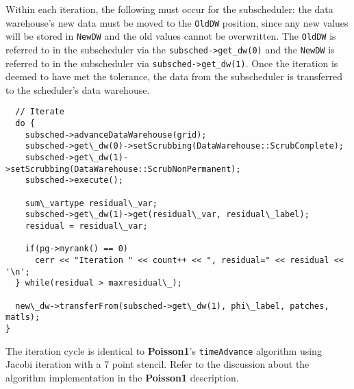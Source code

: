 \documentclass[12pt]{report}
\begin{document}
Within each iteration, the following must occur for the subscheduler:
the data warehouse's new data must be moved to the \texttt{OldDW}
position, since any new values will be stored in \texttt{NewDW} and
the old values cannot be overwritten.  The \texttt{OldDW} is referred
to in the subscheduler via the \texttt{subsched->get\_dw(0)} and the
\texttt{NewDW} is referred to in the subscheduler via
\texttt{subsched->get\_dw(1)}.  Once the iteration is deemed to have
met the tolerance, the data from the subscheduler is transferred to
the scheduler's data warehouse.

\begin{verbatim}
  // Iterate
  do {
    subsched->advanceDataWarehouse(grid);
    subsched->get\_dw(0)->setScrubbing(DataWarehouse::ScrubComplete);
    subsched->get\_dw(1)->setScrubbing(DataWarehouse::ScrubNonPermanent);
    subsched->execute();    

    sum\_vartype residual\_var;
    subsched->get\_dw(1)->get(residual\_var, residual\_label);
    residual = residual\_var;

    if(pg->myrank() == 0)
      cerr << "Iteration " << count++ << ", residual=" << residual << '\n';
  } while(residual > maxresidual\_);

  new\_dw->transferFrom(subsched->get\_dw(1), phi\_label, patches, matls);
}

\end{verbatim}

The iteration cycle is identical to \textbf{Poisson1}'s
\texttt{timeAdvance} algorithm using Jacobi iteration with a 7 point
stencil.  Refer to the discussion about the algorithm implementation
in the \textbf{Poisson1} description.
\end{document}
